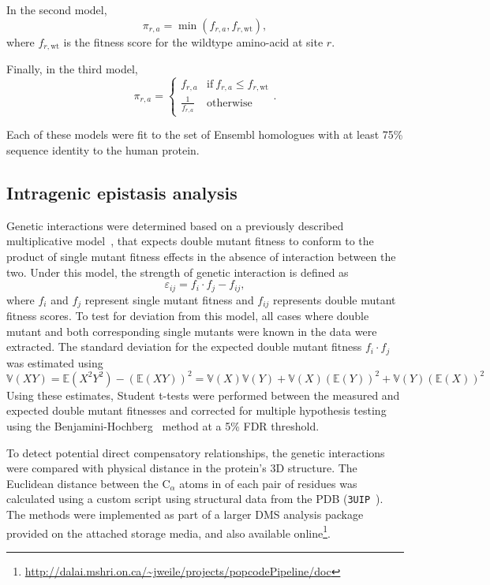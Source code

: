 In the second model, $$\pi_{r,a} = \min(f_{r,a}, f_{r,\text{wt}}),$$ where $f_{r,\text{wt}}$ is the fitness score for the wildtype amino-acid at site $r$. 

Finally, in the third model, $$\pi_{r,a} = \begin{cases} f_{r,a} &  \text{if}~ f_{r,a} \le f_{r,\text{wt}} \\ \frac{1}{f_{r,a}} & \text{otherwise} \end{cases}. $$ 

Each of these models were fit to the set of Ensembl homologues with at least 75\% sequence identity to the human protein. 

\subsection{Intragenic epistasis analysis} Genetic interactions were determined based on a previously described multiplicative model~\cite{phillips_language_1998,onge_systematic_2007}, that expects double mutant fitness to conform to the product of single mutant fitness effects in the absence of interaction between the two. Under this model, the strength of genetic interaction is defined as $$\varepsilon_{ij} = f_i \cdot f_j - f_{ij},$$ where $f_i$ and $f_j$ represent single mutant fitness and $f_{ij}$ represents double mutant fitness scores. To test for deviation from this model, all cases where double mutant and both corresponding single mutants were known in the data were extracted. The standard deviation for the expected double mutant fitness $f_i \cdot f_j$ was estimated using
$$ \mathbb{V}(XY) = \mathbb{E}(X^2Y^2)-(\mathbb{E}(XY))^2=\mathbb{V}(X)\mathbb{V}(Y) + \mathbb{V}(X)(\mathbb{E}(Y))^2+\mathbb{V}(Y)(\mathbb{E}(X))^2 $$ 
Using these estimates, Student t-tests were performed between the measured and expected double mutant fitnesses and corrected for multiple hypothesis testing using the  Benjamini-Hochberg~\cite{benjamini_controlling_1995} method at a 5\% FDR threshold.

To detect potential direct compensatory relationships, the genetic interactions were compared with physical distance in the protein's 3D structure. The Euclidean distance between the C$_\alpha$ atoms in of each pair of residues was calculated using a custom script using structural data from the PDB (\texttt{3UIP}~\cite{gareau_determinants_2012}).
The methods were implemented as part of a larger DMS analysis package provided on the attached storage media, and also available online\footnote{\url{http://dalai.mshri.on.ca/~jweile/projects/popcodePipeline/doc}}.



